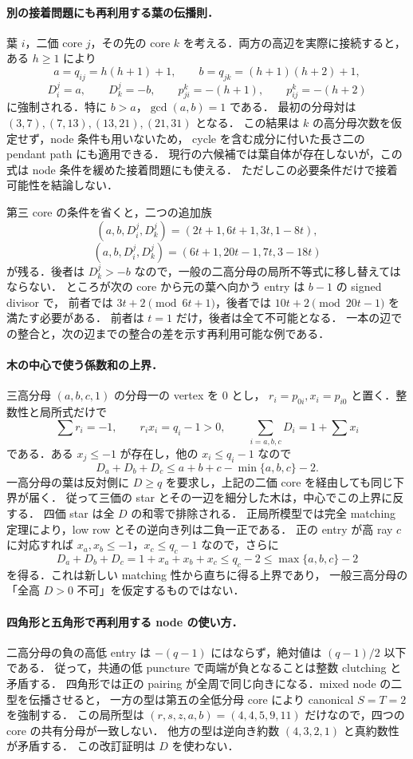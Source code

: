 

\paragraph{別の接着問題にも再利用する葉の伝播則．}
葉 $i$，二価 core $j$，その先の core $k$ を考える．両方の高辺を実際に接続すると，
ある $h\geq1$ により
\[
 a=q_{ij}=h(h+1)+1,\qquad b=q_{jk}=(h+1)(h+2)+1,
\]
\[
 D^j_i=a,\qquad D^j_k=-b,\qquad
 p^k_{ji}=-(h+1),\qquad p^k_{ij}=-(h+2)
\]
に強制される．特に $b>a$，$\gcd(a,b)=1$ である．
最初の分母対は $(3,7),(7,13),(13,21),(21,31)$ となる．
この結果は $k$ の高分母次数を仮定せず，node 条件も用いないため，
cycle を含む成分に付いた長さ二の pendant path にも適用できる．
現行の六候補では葉自体が存在しないが，この式は node 条件を緩めた接着問題にも使える．
ただしこの必要条件だけで接着可能性を結論しない．

第三 core の条件を省くと，二つの追加族
\[
 (a,b,D^j_i,D^j_k)=(2t+1,6t+1,3t,1-8t),
\]
\[
 (a,b,D^j_i,D^j_k)=(6t+1,20t-1,7t,3-18t)
\]
が残る．後者は $D^j_k>-b$ なので，一般の二高分母の局所不等式に移し替えてはならない．
ところが次の core から元の葉へ向かう entry は $b-1$ の signed divisor で，
前者では $3t+2\pmod{6t+1}$，後者では $10t+2\pmod{20t-1}$ を満たす必要がある．
前者は $t=1$ だけ，後者は全て不可能となる．
一本の辺での整合と，次の辺までの整合の差を示す再利用可能な例である．

\paragraph{木の中心で使う係数和の上界．}
三高分母 $(a,b,c,1)$ の分母一の vertex を $0$ とし，
$r_i=p_{0i},x_i=p_{i0}$ と置く．整数性と局所式だけで
\[
 \sum r_i=-1,\qquad r_ix_i=q_i-1>0,\qquad
 \sum_{i=a,b,c}D_i=1+\sum x_i
\]
である．ある $x_j\leq-1$ が存在し，他の $x_i\leq q_i-1$ なので
\[
 D_a+D_b+D_c\leq a+b+c-\min\{a,b,c\}-2.
\]
一高分母の葉は反対側に $D\geq q$ を要求し，上記の二価 core を経由しても同じ下界が届く．
従って三価の star とその一辺を細分した木は，中心でこの上界に反する．
四価 star は全 $D$ の和零で排除される．
正局所模型では完全 matching 定理により，low row とその逆向き列は二負一正である．
正の entry が高 ray $c$ に対応すれば $x_a,x_b\le-1$，$x_c\le q_c-1$ なので，さらに
\[
 D_a+D_b+D_c=1+x_a+x_b+x_c\le q_c-2\le\max\{a,b,c\}-2
\]
を得る．これは新しい matching 性から直ちに得る上界であり，
一般三高分母の「全高 $D>0$ 不可」を仮定するものではない．

\paragraph{四角形と五角形で再利用する node の使い方．}
二高分母の負の高低 entry は $-(q-1)$ にはならず，絶対値は $(q-1)/2$ 以下である．
従って，共通の低 puncture で両端が負となることは整数 clutching と矛盾する．
四角形では正の pairing が全周で同じ向きになる．mixed node の二型を伝播させると，
一方の型は第五の全低分母 core により canonical $S=T=2$ を強制する．
この局所型は $(r,s,z,a,b)=(4,4,5,9,11)$ だけなので，四つの core の共有分母が一致しない．
他方の型は逆向き約数 $(4,3,2,1)$ と真約数性が矛盾する．
この改訂証明は $D$ を使わない．

